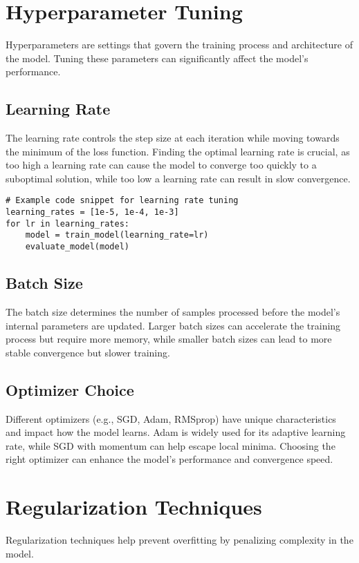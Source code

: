 \section{Hyperparameter Tuning}
Hyperparameters are settings that govern the training process and architecture of the model. Tuning these parameters can significantly affect the model's performance.

\subsection{Learning Rate}
The learning rate controls the step size at each iteration while moving towards the minimum of the loss function. Finding the optimal learning rate is crucial, as too high a learning rate can cause the model to converge too quickly to a suboptimal solution, while too low a learning rate can result in slow convergence.

\begin{verbatim}
# Example code snippet for learning rate tuning
learning_rates = [1e-5, 1e-4, 1e-3]
for lr in learning_rates:
    model = train_model(learning_rate=lr)
    evaluate_model(model)
\end{verbatim}

\subsection{Batch Size}
The batch size determines the number of samples processed before the model's internal parameters are updated. Larger batch sizes can accelerate the training process but require more memory, while smaller batch sizes can lead to more stable convergence but slower training.

\subsection{Optimizer Choice}
Different optimizers (e.g., SGD, Adam, RMSprop) have unique characteristics and impact how the model learns. Adam is widely used for its adaptive learning rate, while SGD with momentum can help escape local minima. Choosing the right optimizer can enhance the model's performance and convergence speed.

\section{Regularization Techniques}
Regularization techniques help prevent overfitting by penalizing complexity in the model.

